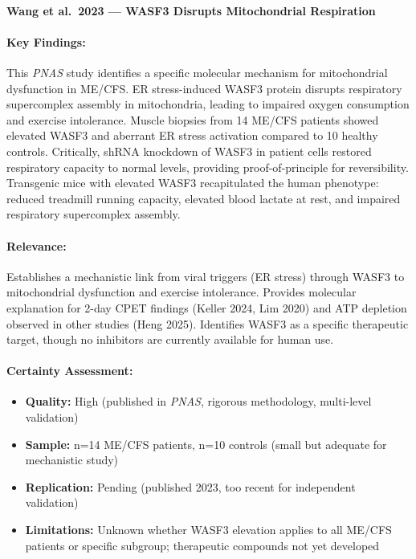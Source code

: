 \paragraph{Wang et al.\ 2023 --- WASF3 Disrupts Mitochondrial Respiration}

\cite{wang2023wasf3}

\paragraph{Key Findings:}
This \emph{PNAS} study identifies a specific molecular mechanism for mitochondrial dysfunction in ME/CFS. ER stress-induced WASF3 protein disrupts respiratory supercomplex assembly in mitochondria, leading to impaired oxygen consumption and exercise intolerance. Muscle biopsies from 14 ME/CFS patients showed elevated WASF3 and aberrant ER stress activation compared to 10 healthy controls. Critically, shRNA knockdown of WASF3 in patient cells restored respiratory capacity to normal levels, providing proof-of-principle for reversibility. Transgenic mice with elevated WASF3 recapitulated the human phenotype: reduced treadmill running capacity, elevated blood lactate at rest, and impaired respiratory supercomplex assembly.

\paragraph{Relevance:}
Establishes a mechanistic link from viral triggers (ER stress) through WASF3 to mitochondrial dysfunction and exercise intolerance. Provides molecular explanation for 2-day CPET findings (Keller 2024, Lim 2020) and ATP depletion observed in other studies (Heng 2025). Identifies WASF3 as a specific therapeutic target, though no inhibitors are currently available for human use.

\paragraph{Certainty Assessment:}
\begin{itemize}
    \item \textbf{Quality:} High (published in \emph{PNAS}, rigorous methodology, multi-level validation)
    \item \textbf{Sample:} n=14 ME/CFS patients, n=10 controls (small but adequate for mechanistic study)
    \item \textbf{Replication:} Pending (published 2023, too recent for independent validation)
    \item \textbf{Limitations:} Unknown whether WASF3 elevation applies to all ME/CFS patients or specific subgroup; therapeutic compounds not yet developed
\end{itemize}

